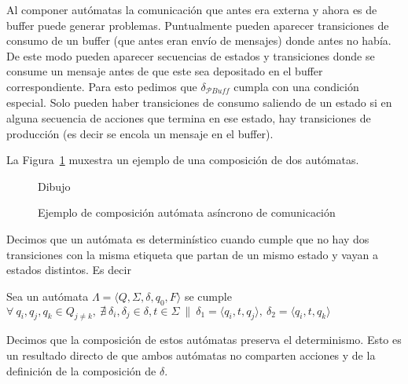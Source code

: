 \begin{definition}[Composición]
Al componer autómatas la comunicación que antes era externa y ahora es de buffer puede generar problemas. Puntualmente pueden aparecer transiciones de consumo de un buffer (que antes eran envío de mensajes) donde antes no había. De este modo pueden aparecer secuencias de estados y transiciones donde se consume un mensaje antes de que este sea depositado en el buffer correspondiente. Para esto pedimos que $\delta_\mathit{\mathcal{P}Buff}$ cumpla con una condición especial. Solo pueden haber transiciones de consumo saliendo de un estado si en alguna secuencia de acciones que termina en ese estado, hay transiciones de producción (es decir se encola un mensaje en el buffer).

\end{definition}


La Figura~\ref{fig:ejemplo-aa} muxestra un ejemplo de una composición de dos autómatas. 

\begin{figure}[ht]
\begin{center}
Dibujo
\end{center}
\caption{Ejemplo de composición autómata asíncrono de comunicación}
\label{fig:ejemplo-aa}
\end{figure} 

\begin{definition}[Determinismo] Decimos que un autómata es determinístico cuando cumple que no hay dos transiciones con la misma etiqueta que partan de un mismo estado y vayan a estados distintos. Es decir 

\begin{centering}
Sea un autómata $ \Lambda = \langle Q, \Sigma, \delta, q_0, F \rangle$ se cumple
$ \forall \  q_i, q_j, q_k \in Q_{j \neq k}, \  \nexists \ \delta_i, \delta_j \in \delta, t \in \Sigma \ \| \  \delta_1 = \langle q_i, t, q_j \rangle, \ \delta_2 = \langle q_i, t, q_k \rangle$ \\
\end{centering} 

Decimos que la composición de estos autómatas preserva el determinismo. Esto es un resultado directo de que ambos autómatas no comparten acciones y de la definición de la composición de $\delta$.

\end{definition}


